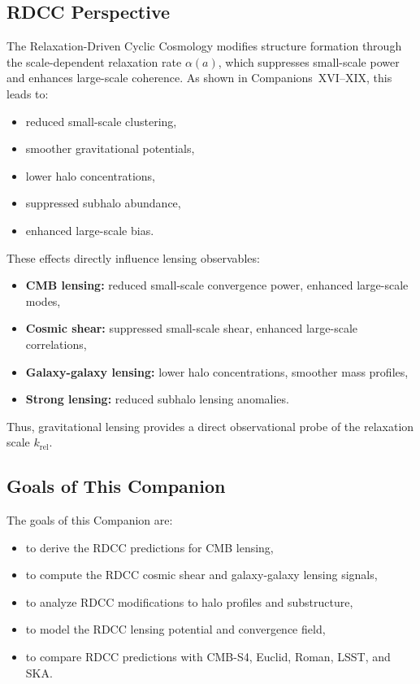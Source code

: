 \documentclass[11pt,a4paper]{article}
\begin{document}
\subsection{RDCC Perspective}

The Relaxation-Driven Cyclic Cosmology modifies structure formation through the
scale-dependent relaxation rate $\alpha(a)$, which suppresses small-scale power and enhances
large-scale coherence. As shown in Companions~XVI–XIX, this leads to:
\begin{itemize}
\item reduced small-scale clustering,
\item smoother gravitational potentials,
\item lower halo concentrations,
\item suppressed subhalo abundance,
\item enhanced large-scale bias.
\end{itemize}

These effects directly influence lensing observables:
\begin{itemize}
\item \textbf{CMB lensing:} reduced small-scale convergence power, enhanced large-scale modes,
\item \textbf{Cosmic shear:} suppressed small-scale shear, enhanced large-scale correlations,
\item \textbf{Galaxy-galaxy lensing:} lower halo concentrations, smoother mass profiles,
\item \textbf{Strong lensing:} reduced subhalo lensing anomalies.
\end{itemize}

Thus, gravitational lensing provides a direct observational probe of the relaxation scale
$k_{\mathrm{rel}}$.

\subsection{Goals of This Companion}

The goals of this Companion are:
\begin{itemize}
\item to derive the RDCC predictions for CMB lensing,
\item to compute the RDCC cosmic shear and galaxy-galaxy lensing signals,
\item to analyze RDCC modifications to halo profiles and substructure,
\item to model the RDCC lensing potential and convergence field,
\item to compare RDCC predictions with CMB-S4, Euclid, Roman, LSST, and SKA.
\end{itemize}
\end{document}
